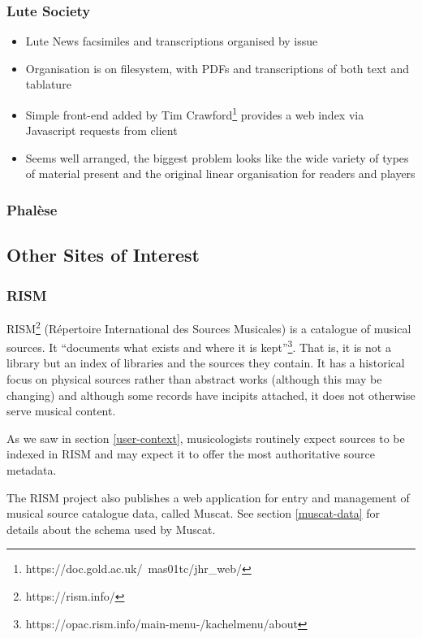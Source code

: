 \documentclass[sigconf]{acmart}
\begin{document}
\begin{sloppypar}
  \subsubsection{Lute Society}

  \begin{itemize}
  \item Lute News facsimiles and transcriptions organised by issue
  \item Organisation is on filesystem, with PDFs and transcriptions of
    both text and tablature
  \item Simple front-end added by Tim
    Crawford\footnote{https://doc.gold.ac.uk/~mas01tc/jhr\_web/}
    provides a web index via Javascript requests from client
  \item Seems well arranged, the biggest problem looks like the wide
    variety of types of material present and the original linear
    organisation for readers and players
  \end{itemize}
  
  \subsubsection{Phal\`ese}

  \subsection{Other Sites of Interest}
  
  \subsubsection{RISM}

  RISM\footnote{https://rism.info/} (R\'epertoire International des
  Sources Musicales) is a catalogue of musical sources. It ``documents
  what exists and where it is
  kept''\footnote{https://opac.rism.info/main-menu-/kachelmenu/about}. That
  is, it is not a library but an index of libraries and the sources
  they contain. It has a historical focus on physical sources rather
  than abstract works (although this may be changing) and although
  some records have incipits attached, it does not otherwise serve
  musical content.

  As we saw in section \ref{user-context}, musicologists routinely
  expect sources to be indexed in RISM and may expect it to offer the
  most authoritative source metadata.

  The RISM project also publishes a web application for entry and
  management of musical source catalogue data, called Muscat. See
  section \ref{muscat-data} for details about the schema used by
  Muscat.


\end{sloppypar}
\end{document}
